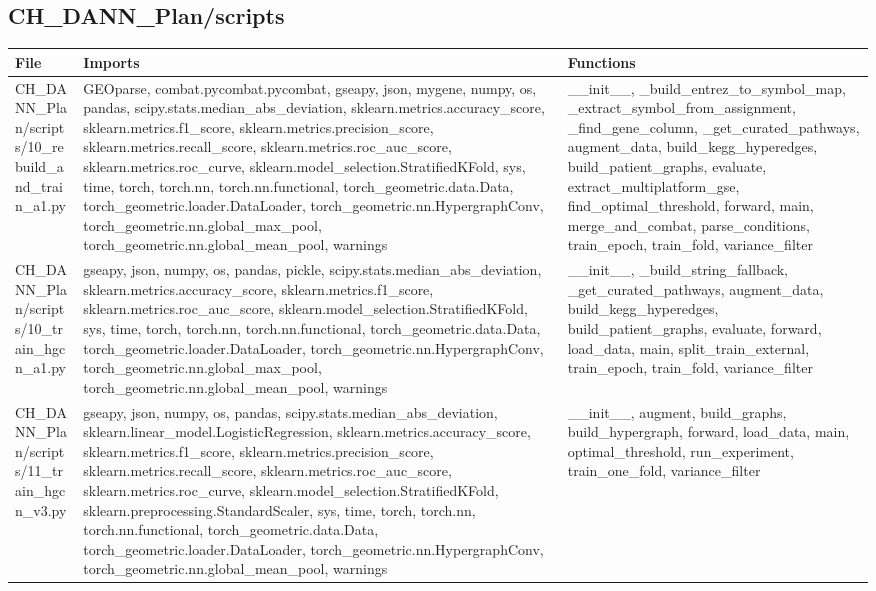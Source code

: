 \documentclass[11pt]{article}
\begin{document}
\subsection{CH\_DANN\_Plan/scripts}
\begin{longtable}{p{}p{}p{}}
\textbf{File} & \textbf{Imports} & \textbf{Functions} \\ \hline
CH\_DANN\_Plan/scripts/10\_rebuild\_and\_train\_a1.py & GEOparse, combat.pycombat.pycombat, gseapy, json, mygene, numpy, os, pandas, scipy.stats.median\_abs\_deviation, sklearn.metrics.accuracy\_score, sklearn.metrics.f1\_score, sklearn.metrics.precision\_score, sklearn.metrics.recall\_score, sklearn.metrics.roc\_auc\_score, sklearn.metrics.roc\_curve, sklearn.model\_selection.StratifiedKFold, sys, time, torch, torch.nn, torch.nn.functional, torch\_geometric.data.Data, torch\_geometric.loader.DataLoader, torch\_geometric.nn.HypergraphConv, torch\_geometric.nn.global\_max\_pool, torch\_geometric.nn.global\_mean\_pool, warnings & \_\_init\_\_, \_build\_entrez\_to\_symbol\_map, \_extract\_symbol\_from\_assignment, \_find\_gene\_column, \_get\_curated\_pathways, augment\_data, build\_kegg\_hyperedges, build\_patient\_graphs, evaluate, extract\_multiplatform\_gse, find\_optimal\_threshold, forward, main, merge\_and\_combat, parse\_conditions, train\_epoch, train\_fold, variance\_filter \\
CH\_DANN\_Plan/scripts/10\_train\_hgcn\_a1.py & gseapy, json, numpy, os, pandas, pickle, scipy.stats.median\_abs\_deviation, sklearn.metrics.accuracy\_score, sklearn.metrics.f1\_score, sklearn.metrics.roc\_auc\_score, sklearn.model\_selection.StratifiedKFold, sys, time, torch, torch.nn, torch.nn.functional, torch\_geometric.data.Data, torch\_geometric.loader.DataLoader, torch\_geometric.nn.HypergraphConv, torch\_geometric.nn.global\_max\_pool, torch\_geometric.nn.global\_mean\_pool, warnings & \_\_init\_\_, \_build\_string\_fallback, \_get\_curated\_pathways, augment\_data, build\_kegg\_hyperedges, build\_patient\_graphs, evaluate, forward, load\_data, main, split\_train\_external, train\_epoch, train\_fold, variance\_filter \\
CH\_DANN\_Plan/scripts/11\_train\_hgcn\_v3.py & gseapy, json, numpy, os, pandas, scipy.stats.median\_abs\_deviation, sklearn.linear\_model.LogisticRegression, sklearn.metrics.accuracy\_score, sklearn.metrics.f1\_score, sklearn.metrics.precision\_score, sklearn.metrics.recall\_score, sklearn.metrics.roc\_auc\_score, sklearn.metrics.roc\_curve, sklearn.model\_selection.StratifiedKFold, sklearn.preprocessing.StandardScaler, sys, time, torch, torch.nn, torch.nn.functional, torch\_geometric.data.Data, torch\_geometric.loader.DataLoader, torch\_geometric.nn.HypergraphConv, torch\_geometric.nn.global\_mean\_pool, warnings & \_\_init\_\_, augment, build\_graphs, build\_hypergraph, forward, load\_data, main, optimal\_threshold, run\_experiment, train\_one\_fold, variance\_filter \\

\end{longtable}
\end{document}
